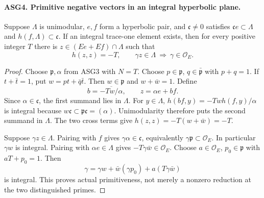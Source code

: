 \documentclass[11pt,a4paper]{article}
\numberwithin{equation}{section}
\theoremstyle{remark}\newtheorem{remark}[theorem]{Remark}
\begin{document}
\paragraph{ASG4. Primitive negative vectors in an integral hyperbolic plane.}
\label{claim:ASG4}
Suppose \(\Lambda\) is unimodular, \(e,f\) form a hyperbolic
pair, and \(\mathfrak c\ne0\) satisfies
\(\mathfrak c e\subset\Lambda\) and
\(h(f,\Lambda)\subset\mathfrak c\).  If an integral trace-one
element exists, then for every positive integer \(T\) there is
\(z\in(Ee+Ef)\cap\Lambda\) such that
\[
 h(z,z)=-T,\qquad
       \gamma z\in\Lambda\ \Longrightarrow\ \gamma\in\mathcal O_E.
\tag{ASG.4}
\]
\begin{proof}
Choose \(\mathfrak p,\alpha\) from ASG3 with \(N=T\).
Choose \(p\in\mathfrak p\), \(q\in\bar{\mathfrak p}\)
with \(p+q=1\).  If \(t+\bar t=1\), put
\(w=pt+\bar q\bar t\).  Then \(w\in\mathfrak p\)
and \(w+\bar w=1\).  Define
\[
             b=\overline{-Tw/\alpha},\qquad z=\alpha e+bf.
\tag{ASG.5}
\]
Since \(\alpha\in\mathfrak c\), the first summand lies in
\(\Lambda\).  For \(y\in\Lambda\),
\(h(bf,y)=-Tw h(f,y)/\alpha\) is integral because
\(w\mathfrak c\subset\mathfrak p\mathfrak c=(\alpha)\).
Unimodularity therefore puts the second summand in \(\Lambda\).
The two cross terms give \(h(z,z)=-T(w+\bar w)=-T\).

Suppose \(\gamma z\in\Lambda\).  Pairing with \(f\)
gives \(\gamma\alpha\in\mathfrak c\), equivalently
\(\gamma\mathfrak p\subset\mathcal O_E\).  In particular
\(\gamma w\) is integral.  Pairing with \(\alpha e\in\Lambda\)
gives \(-T\gamma\bar w\in\mathcal O_E\).
Choose \(a\in\mathcal O_E\), \(p_0\in\mathfrak p\)
with \(aT+p_0=1\).  Then
\[
        \gamma=\gamma w+\bar w(\gamma p_0)
                              +a(T\gamma\bar w)
\]
is integral.  This proves actual primitiveness, not merely a nonzero
reduction at the two distinguished primes.
\end{proof}

\end{document}
